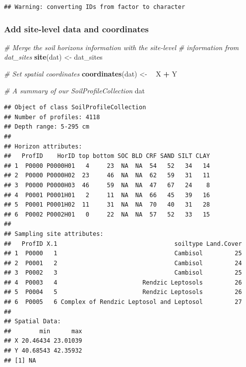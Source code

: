 \documentclass[10pt,b5paper,]{book}
\newenvironment{Shaded}{\begin{snugshade}}{\end{snugshade}}
\newcommand{\CommentTok}[1]{\textcolor[rgb]{0.56,0.35,0.01}{\textit{#1}}}
\newcommand{\ErrorTok}[1]{\textcolor[rgb]{0.64,0.00,0.00}{\textbf{#1}}}
\newcommand{\KeywordTok}[1]{\textcolor[rgb]{0.13,0.29,0.53}{\textbf{#1}}}
\newcommand{\NormalTok}[1]{#1}
\newcommand{\OperatorTok}[1]{\textcolor[rgb]{0.81,0.36,0.00}{\textbf{#1}}}
\newcommand{\StringTok}[1]{\textcolor[rgb]{0.31,0.60,0.02}{#1}}
\theoremstyle{definition}
\theoremstyle{definition}
\theoremstyle{definition}
\theoremstyle{remark}
\begin{document}
\begin{verbatim}
## Warning: converting IDs from factor to character
\end{verbatim}

\hypertarget{add-site-level-data-and-coordinates}{%
\subsubsection{Add site-level data and
coordinates}\label{add-site-level-data-and-coordinates}}

\begin{Shaded}
\begin{Highlighting}[]
\CommentTok{# Merge the soil horizons information with the site-level }
\CommentTok{# information from dat_sites}
\KeywordTok{site}\NormalTok{(dat) <-}\StringTok{ }\NormalTok{dat_sites}

\CommentTok{# Set spatial coordinates}
\KeywordTok{coordinates}\NormalTok{(dat) <-}\StringTok{ }\ErrorTok{~}\StringTok{ }\NormalTok{X }\OperatorTok{+}\StringTok{ }\NormalTok{Y}

\CommentTok{# A summary of our SoilProfileCollection}
\NormalTok{dat}
\end{Highlighting}
\end{Shaded}

\begin{verbatim}
## Object of class SoilProfileCollection
## Number of profiles: 4118
## Depth range: 5-295 cm
## 
## Horizon attributes:
##   ProfID    HorID top bottom SOC BLD CRF SAND SILT CLAY
## 1  P0000 P0000H01   4     23  NA  NA  54   52   34   14
## 2  P0000 P0000H02  23     46  NA  NA  62   59   31   11
## 3  P0000 P0000H03  46     59  NA  NA  47   67   24    8
## 4  P0001 P0001H01   2     11  NA  NA  66   45   39   16
## 5  P0001 P0001H02  11     31  NA  NA  70   40   31   28
## 6  P0002 P0002H01   0     22  NA  NA  57   52   33   15
## 
## Sampling site attributes:
##   ProfID X.1                                 soiltype Land.Cover
## 1  P0000   1                                 Cambisol         25
## 2  P0001   2                                 Cambisol         24
## 3  P0002   3                                 Cambisol         25
## 4  P0003   4                        Rendzic Leptosols         26
## 5  P0004   5                        Rendzic Leptosols         26
## 6  P0005   6 Complex of Rendzic Leptosol and Leptosol         27
## 
## Spatial Data:
##        min      max
## X 20.46434 23.01039
## Y 40.68543 42.35932
## [1] NA
\end{verbatim}
\end{document}
